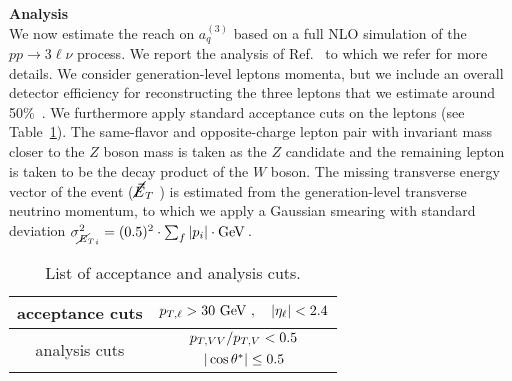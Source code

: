 \documentclass[../report.tex]{subfiles}
\begin{document}
\vspace{1cm}
\noindent
{\bf Analysis}\\
We now estimate the reach on $a_q^{(3)}$ based on a full NLO simulation of the $pp \to 3\ell\nu$ process. We report the analysis
of Ref.~\cite{Franceschini:2017ab} to which we refer for more details.
We consider generation-level leptons momenta, but we include an overall detector efficiency for reconstructing the three leptons that we estimate around 50\%~\cite{ATLAS:2016iqc}. We furthermore apply standard acceptance cuts on the leptons (see Table~\ref{tab:cuts}).
The same-flavor and opposite-charge lepton pair with invariant mass closer to the $Z$ boson mass is taken as the $Z$ candidate and the remaining lepton  is taken to be the decay product of the $W$ boson. The missing transverse energy vector of the event ($\cancel{\vec{E}}_T$ ) is estimated from the generation-level transverse neutrino momentum, to which we apply a Gaussian smearing with standard deviation
$ \sigma_{{\met}_{i}}^2 = (0.5)^2 \cdot \sum_f |p_i| \cdot {\rm{GeV}}\,$.

\begin{table}
\centering
\begin{tabular}{c|c}
acceptance cuts &
$p_{T,\ell}>30 ~\text{GeV} \ ,\quad |\eta_{\ell}|<2.4$\\
\hline
\multirow{2}{*}{analysis cuts} &
$\deltapt/p_{T,V}<%
0.5$\\
& $|\cos \thetastar| \leq %
0.5$
\end{tabular}
\caption{List of acceptance and analysis cuts.}\label{tab:cuts}
\end{table}
\end{document}
